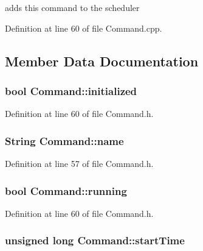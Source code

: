 adds this command to the scheduler 



Definition at line 60 of file Command.\-cpp.



\subsection{Member Data Documentation}
\hypertarget{classCommand_aa9dd747d430f9367da9b17545404f79e}{
\subsubsection[{initialized}]{\setlength{\rightskip}{0pt plus 5cm}bool Command\-::initialized\hspace{0.3cm}{\ttfamily [private]}}}\label{classCommand_aa9dd747d430f9367da9b17545404f79e}


Definition at line 60 of file Command.\-h.

\hypertarget{classCommand_a19f7ad73ca8599ad47f9b7bcccc52610}{
\subsubsection[{name}]{\setlength{\rightskip}{0pt plus 5cm}String Command\-::name}}\label{classCommand_a19f7ad73ca8599ad47f9b7bcccc52610}


Definition at line 57 of file Command.\-h.

\hypertarget{classCommand_a8e31897f049af332a2421c9721fda18b}{
\subsubsection[{running}]{\setlength{\rightskip}{0pt plus 5cm}bool Command\-::running\hspace{0.3cm}{\ttfamily [private]}}}\label{classCommand_a8e31897f049af332a2421c9721fda18b}


Definition at line 60 of file Command.\-h.

\hypertarget{classCommand_af537856a06286a62d7200d84f901c72e}{
\subsubsection[{start\-Time}]{\setlength{\rightskip}{0pt plus 5cm}unsigned long Command\-::start\-Time\hspace{0.3cm}{\ttfamily [private]}}}\label{classCommand_af537856a06286a62d7200d84f901c72e}


